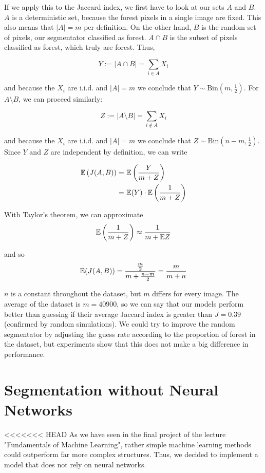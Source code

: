If we apply this to the Jaccard index, we first have to look at our sets $A$ and $B$. $A$ is a deterministic set, because the forest pixels in a single image are fixed. This also means that $|A|=m$ per definition. On the other hand, $B$ is the random set of pixels, our segmentator classified as forest. $A \cap B$ is the subset of pixels classified as forest, which truly are forest. Thus,

\begin{equation}
  Y:= |A \cap B| = \sum_{i \in A} X_i
\end{equation}

and because the $X_i$ are i.i.d. and $|A|=m$ we conclude that $Y\sim \text{Bin}(m, \frac{1}{2})$. For $A\setminus B$, we can proceed similarly:

\begin{equation}
  Z:= |A\setminus B| = \sum_{i \notin A} X_i
\end{equation}

and because the $X_i$ are i.i.d. and $|A|=m$ we conclude that $Z\sim \text{Bin}\left (n-m, \frac{1}{2} \right)$. Since $Y$ and $Z$ are independent by definition, we can write

\begin{align*}
  \mathbb{E}\left(J(A,B)\right) = \ & \mathbb{E} \left(\frac{Y}{m+Z} \right) \\
   = \ & \mathbb{E}(Y) \cdot \mathbb{E} \left(\frac{1}{m+Z} \right)
\end{align*}

With Taylor's theorem, we can approximate
\begin{equation}
  \mathbb{E} \left(\frac{1}{m+Z}\right) \approx \frac{1}{m+\mathbb{E} Z}
\end{equation}

and so
\begin{equation}
  \mathbb{E}(J(A,B)) = \frac{\frac{m}{2}}{m + \frac{n-m}{2}} = \frac{m}{m+n}
\end{equation}

$n$ is a constant throughout the dataset, but $m$ differs for every image. The average of the dataset is $m=40900$, so we can say that our models perform better than guessing if their average Jaccard index is greater than $J = 0.39$ (confirmed by random simulations). We could try to improve the random segmentator by adjusting the guess rate according to the proportion of forest in the dataset, but experiments show that this does not make a big difference in performance.\\

\section{Segmentation without Neural Networks}
<<<<<<< HEAD
As we have seen in the final project of the lecture "Fundamentals of Machine Learning", rather simple machine learning methods could outperform far more complex structures. Thus, we decided to implement a model that does not rely on neural networks.

